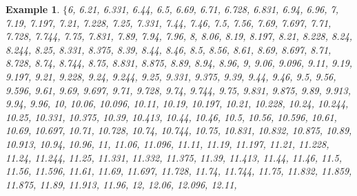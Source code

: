 \documentclass[a4paper,12pt,twoside]{memoir}
\newtheorem{example}{Example}[chapter]
\begin{document}
\begin{example}
		\noindent\begingroup\sloppy
		$\{$6,\allowbreak{} 6.21,\allowbreak{} 6.331,\allowbreak{} 6.44,\allowbreak{} 6.5,\allowbreak{} 6.69,\allowbreak{} 6.71,\allowbreak{} 6.728,\allowbreak{} 6.831,\allowbreak{} 6.94,\allowbreak{} 6.96,\allowbreak{} 7,\allowbreak{} 7.19,\allowbreak{} 7.197,\allowbreak{} 7.21,\allowbreak{} 7.228,\allowbreak{} 7.25,\allowbreak{} 7.331,\allowbreak{} 7.44,\allowbreak{} 7.46,\allowbreak{} 7.5,\allowbreak{} 7.56,\allowbreak{} 7.69,\allowbreak{} 7.697,\allowbreak{} 7.71,\allowbreak{} 7.728,\allowbreak{} 7.744,\allowbreak{} 7.75,\allowbreak{} 7.831,\allowbreak{} 7.89,\allowbreak{} 7.94,\allowbreak{} 7.96,\allowbreak{} 8,\allowbreak{} 8.06,\allowbreak{} 8.19,\allowbreak{} 8.197,\allowbreak{} 8.21,\allowbreak{} 8.228,\allowbreak{} 8.24,\allowbreak{} 8.244,\allowbreak{} 8.25,\allowbreak{} 8.331,\allowbreak{} 8.375,\allowbreak{} 8.39,\allowbreak{} 8.44,\allowbreak{} 8.46,\allowbreak{} 8.5,\allowbreak{} 8.56,\allowbreak{} 8.61,\allowbreak{} 8.69,\allowbreak{} 8.697,\allowbreak{} 8.71,\allowbreak{} 8.728,\allowbreak{} 8.74,\allowbreak{} 8.744,\allowbreak{} 8.75,\allowbreak{} 8.831,\allowbreak{} 8.875,\allowbreak{} 8.89,\allowbreak{} 8.94,\allowbreak{} 8.96,\allowbreak{} 9,\allowbreak{} 9.06,\allowbreak{} 9.096,\allowbreak{} 9.11,\allowbreak{} 9.19,\allowbreak{} 9.197,\allowbreak{} 9.21,\allowbreak{} 9.228,\allowbreak{} 9.24,\allowbreak{} 9.244,\allowbreak{} 9.25,\allowbreak{} 9.331,\allowbreak{} 9.375,\allowbreak{} 9.39,\allowbreak{} 9.44,\allowbreak{} 9.46,\allowbreak{} 9.5,\allowbreak{} 9.56,\allowbreak{} 9.596,\allowbreak{} 9.61,\allowbreak{} 9.69,\allowbreak{} 9.697,\allowbreak{} 9.71,\allowbreak{} 9.728,\allowbreak{} 9.74,\allowbreak{} 9.744,\allowbreak{} 9.75,\allowbreak{} 9.831,\allowbreak{} 9.875,\allowbreak{} 9.89,\allowbreak{} 9.913,\allowbreak{} 9.94,\allowbreak{} 9.96,\allowbreak{} 10,\allowbreak{} 10.06,\allowbreak{} 10.096,\allowbreak{} 10.11,\allowbreak{} 10.19,\allowbreak{} 10.197,\allowbreak{} 10.21,\allowbreak{} 10.228,\allowbreak{} 10.24,\allowbreak{} 10.244,\allowbreak{} 10.25,\allowbreak{} 10.331,\allowbreak{} 10.375,\allowbreak{} 10.39,\allowbreak{} 10.413,\allowbreak{} 10.44,\allowbreak{} 10.46,\allowbreak{} 10.5,\allowbreak{} 10.56,\allowbreak{} 10.596,\allowbreak{} 10.61,\allowbreak{} 10.69,\allowbreak{} 10.697,\allowbreak{} 10.71,\allowbreak{} 10.728,\allowbreak{} 10.74,\allowbreak{} 10.744,\allowbreak{} 10.75,\allowbreak{} 10.831,\allowbreak{} 10.832,\allowbreak{} 10.875,\allowbreak{} 10.89,\allowbreak{} 10.913,\allowbreak{} 10.94,\allowbreak{} 10.96,\allowbreak{} 11,\allowbreak{} 11.06,\allowbreak{} 11.096,\allowbreak{} 11.11,\allowbreak{} 11.19,\allowbreak{} 11.197,\allowbreak{} 11.21,\allowbreak{} 11.228,\allowbreak{} 11.24,\allowbreak{} 11.244,\allowbreak{} 11.25,\allowbreak{} 11.331,\allowbreak{} 11.332,\allowbreak{} 11.375,\allowbreak{} 11.39,\allowbreak{} 11.413,\allowbreak{} 11.44,\allowbreak{} 11.46,\allowbreak{} 11.5,\allowbreak{} 11.56,\allowbreak{} 11.596,\allowbreak{} 11.61,\allowbreak{} 11.69,\allowbreak{} 11.697,\allowbreak{} 11.728,\allowbreak{} 11.74,\allowbreak{} 11.744,\allowbreak{} 11.75,\allowbreak{} 11.832,\allowbreak{} 11.859,\allowbreak{} 11.875,\allowbreak{} 11.89,\allowbreak{} 11.913,\allowbreak{} 11.96,\allowbreak{} 12,\allowbreak{} 12.06,\allowbreak{} 12.096,\allowbreak{} 12.11,\allowbreak{} 
\end{example}
\end{document}
